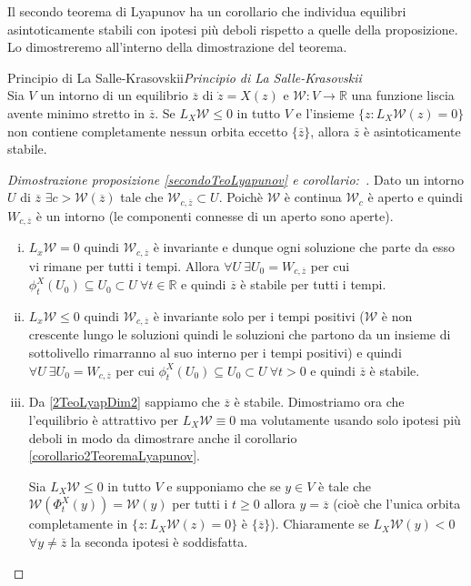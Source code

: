 \documentclass[11pt,a4paper,twoside]{book}
\newenvironment{corollario}[1][\empty]{\begin{Corollario}{
\ifx\empty#1\relax\else\mdseries\itshape#1\\\fi
}{}}{\end{Corollario}}
\newenvironment{dimo}[1][\proofname]{
	\begin{tcolorbox}[
	breakable, 
	enhanced, 
	interior hidden, 
	frame hidden, 
	borderline west = {1pt}{0pt}{gray}, 
	top=0pt, bottom=0pt, left=0pt]
\begin{proof}[#1:~]
}
{
\end{proof}
\end{tcolorbox}
}
\theoremstyle{esss}
\theoremstyle{dotless}
\numberwithin{equation}{section} %
\begin{document}
Il secondo teorema di Lyapunov ha un corollario che individua equilibri asintoticamente stabili con ipotesi più deboli rispetto a quelle della proposizione. Lo dimostreremo all'interno della dimostrazione del teorema.

\begin{corollario}[Principio di La Salle-Krasovskii]\label{corollario2TeoremaLyapunov}
Sia $V$ un intorno di un equilibrio $\overline{z}$ di $\dot{z}=X(z)$ e $\mathcal{W}:V\rightarrow\mathbb{R}$ una funzione liscia avente minimo stretto in $\overline{z}$. Se $L_X\mathcal{W}\leq 0$ in tutto $V$ e l'insieme $\{ z:L_X\mathcal{W}(z)=0 \}$ non contiene completamente nessun orbita eccetto $\{ \overline{z} \}$, allora $\overline{z}$ è asintoticamente stabile. 
\end{corollario}

\begin{dimo}[Dimostrazione proposizione \ref{secondoTeoLyapunov} e corollario]
Dato un intorno $U$ di $\overline{z}$ $\exists c>\mathcal{W}(\overline{z})$ tale che $\mathcal{W}_{c,\overline{z}}\subset U$. 
Poichè $\mathcal{W}$ è continua $\mathcal{W}_c$ è aperto e quindi $W_{c,\overline{z}}$ è un intorno (le componenti connesse di un aperto sono aperte).

\begin{enumerate}[i.]
\item $L_x\mathcal{W}=0$ quindi $\mathcal{W}_{c,\overline{z}}$ è invariante e dunque ogni soluzione che parte da esso vi rimane per tutti i tempi. Allora $\forall U \> \exists U_0=W_{c,\overline{z}}$ per cui $\phi_t^X(U_0)\subseteq U_0\subset U\> \forall t\in\mathbb{R}$ e quindi $\overline{z}$ è stabile per tutti i tempi.
\item\label{2TeoLyapDim2} $L_x\mathcal{W}\leq0$ quindi $\mathcal{W}_{c,\overline{z}}$ è invariante solo per i tempi positivi ($\mathcal{W}$ è non crescente lungo le soluzioni quindi  le soluzioni che partono da un insieme di sottolivello rimarranno al suo interno per i tempi positivi) e quindi $\forall U \> \exists U_0=W_{c,\overline{z}}$ per cui $\phi_t^X(U_0)\subseteq U_0\subset U\> \forall t>0$ e quindi $\overline{z}$ è stabile.
\item Da \ref{2TeoLyapDim2} sappiamo che $\overline{z}$ è stabile. 
Dimostriamo ora che l'equilibrio è attrattivo per $L_X\mathcal{W}\equiv 0$ ma volutamente usando solo ipotesi più deboli in modo da dimostrare anche il corollario \ref{corollario2TeoremaLyapunov}.

Sia $L_X\mathcal{W}\leq 0$ in tutto $V$ e supponiamo che se $y\in V$ è tale che $\mathcal{W}(\Phi_t^X(y))=\mathcal{W}(y)$ per tutti i $t\geq0$ allora $y=\overline{z}$ (cioè che l'unica orbita completamente in $\{z:L_X\mathcal{W}(z)=0\}$ è $\{\overline{z}\}$).
Chiaramente se $L_X\mathcal{W}(y)<0$ $\forall y\neq\overline{z}$ la seconda ipotesi è soddisfatta.


\end{enumerate}
\end{dimo}
\end{document}
